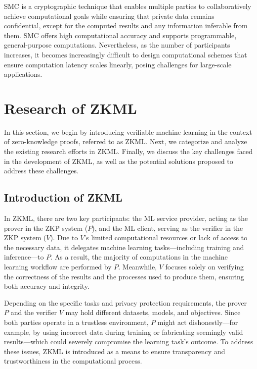 \documentclass[journal]{IEEEtran}
\begin{document}
SMC \cite{zhao2019secure} is a cryptographic technique that enables multiple parties to collaboratively achieve computational goals while ensuring that private data remains confidential, except for the computed results and any information inferable from them. SMC offers high computational accuracy and supports programmable, general-purpose computations. Nevertheless, as the number of participants increases, it becomes increasingly difficult to design computational schemes that ensure computation latency scales linearly, posing challenges for large-scale applications.







\section{Research of ZKML} \label{s:3}

In this section, we begin by introducing verifiable machine learning in the context of zero-knowledge proofs, referred to as ZKML. Next, we categorize and analyze the existing research efforts in ZKML. Finally, we discuss the key challenges faced in the development of ZKML, as well as the potential solutions proposed to address these challenges.


\subsection{Introduction of ZKML}\label{ss:3a}
In ZKML, there are two key participants: the ML service provider, acting as the prover in the ZKP system ($P$), and the ML client, serving as the verifier in the ZKP system ($V$). Due to $V$'s limited computational resources or lack of access to the necessary data, it delegates machine learning tasks---including training and inference---to $P$. As a result, the majority of computations in the machine learning workflow are performed by $P$. Meanwhile, $V$ focuses solely on verifying the correctness of the results and the processes used to produce them, ensuring both accuracy and integrity.



Depending on the specific tasks and privacy protection requirements, the prover $P$ and the verifier $V$ may hold different datasets, models, and objectives. Since both parties operate in a trustless environment, $P$ might act dishonestly---for example, by using incorrect data during training or fabricating seemingly valid results---which could severely compromise the learning task's outcome. To address these issues, ZKML is introduced as a means to ensure transparency and trustworthiness in the computational process.
\end{document}
